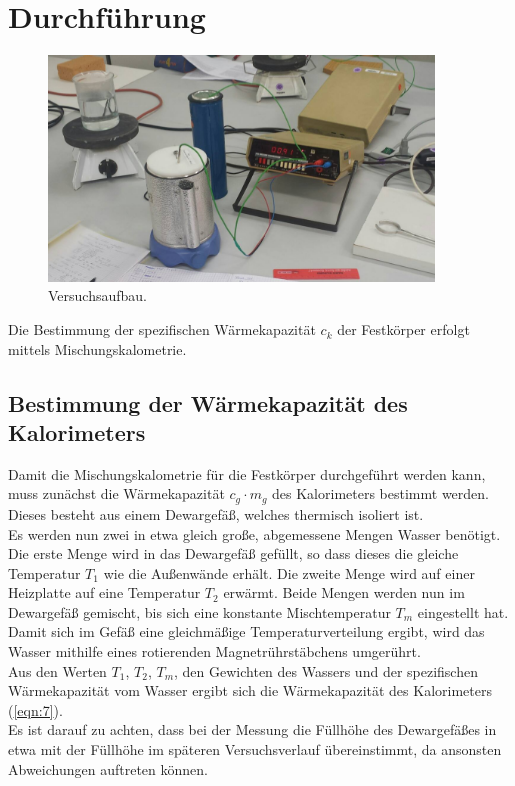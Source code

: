 \section{Durchführung}
\label{sec:Durchfuehrung}

\begin{figure}[H]
  \centering
  \includegraphics[height=6cm]{aufbau.png}
  \caption{Versuchsaufbau.}
  \label{fig:aufbau}
\end{figure}


Die Bestimmung der spezifischen Wärmekapazität $c_k$ der Festkörper erfolgt mittels Mischungskalometrie.
\subsection{Bestimmung der Wärmekapazität des Kalorimeters}
Damit die Mischungskalometrie für die Festkörper durchgeführt werden kann, muss zunächst die Wärmekapazität $c_g \cdot m_g$ des Kalorimeters bestimmt werden.
Dieses besteht aus einem Dewargefäß, welches thermisch isoliert ist. \\
Es werden nun zwei in etwa gleich große, abgemessene Mengen Wasser benötigt.
Die erste Menge wird in das Dewargefäß gefüllt, so dass dieses die gleiche Temperatur $T_1$ wie die Außenwände erhält.
Die zweite Menge wird auf einer Heizplatte auf eine Temperatur $T_2$ erwärmt.
Beide Mengen werden nun im Dewargefäß gemischt, bis sich eine konstante Mischtemperatur $T_m$ eingestellt hat.
Damit sich im Gefäß eine gleichmäßige Temperaturverteilung ergibt, wird das Wasser mithilfe eines rotierenden Magnetrührstäbchens umgerührt. \\
Aus den Werten $T_1$, $T_2$, $T_m$, den Gewichten des Wassers und der spezifischen Wärmekapazität vom Wasser ergibt sich die Wärmekapazität des Kalorimeters (\ref{eqn:7}). \\
Es ist darauf zu achten, dass bei der Messung die Füllhöhe des Dewargefäßes in etwa mit der Füllhöhe im späteren Versuchsverlauf übereinstimmt, da ansonsten Abweichungen auftreten können.

